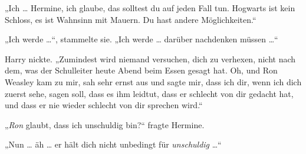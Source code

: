 „Ich … Hermine, ich glaube, das solltest du auf jeden Fall tun. Hogwarts ist kein Schloss, es ist Wahnsinn mit Mauern. Du hast andere Möglichkeiten.“

„Ich werde …“, stammelte sie.
„Ich werde … darüber nachdenken müssen …“

Harry nickte.
„Zumindest wird niemand versuchen, dich zu verhexen, nicht nach dem, was der Schulleiter heute Abend beim Essen gesagt hat. Oh, und Ron Weasley kam zu mir, sah sehr ernst aus und sagte mir, dass ich dir, wenn ich dich zuerst sehe, sagen soll, dass es ihm leidtut, dass er schlecht von dir gedacht hat, und dass er nie wieder schlecht von dir sprechen wird.“

„\emph{Ron} glaubt, dass ich unschuldig bin?“ fragte Hermine.

„Nun … äh … er hält dich nicht unbedingt für \emph{unschuldig} …“

\later









